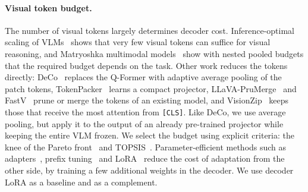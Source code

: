 \paragraph{Visual token budget.}
The number of visual tokens largely determines decoder cost. Inference-optimal scaling
of VLMs~\cite{li2024inferenceoptimal} shows that very few visual tokens can suffice for visual
reasoning, and
Matryoshka multimodal models~\cite{cai2024matryoshka} show with nested pooled budgets that the
required budget depends on the task. Other work reduces the tokens directly:
DeCo~\cite{yao2024deco} replaces the Q-Former with adaptive average pooling of the patch tokens,
TokenPacker~\cite{li2024tokenpacker} learns a compact projector,
LLaVA-PruMerge~\cite{shang2024prumerge} and FastV~\cite{chen2024fastv} prune or merge the tokens
of an existing model, and VisionZip~\cite{yang2025visionzip} keeps those that receive the most
attention from \texttt{[CLS]}. Like DeCo, we use average pooling, but apply it to the output of an
already pre-trained projector while keeping the entire VLM frozen. We select the budget using
explicit criteria:
the knee of the Pareto front~\cite{satopaa2011kneedle} and TOPSIS~\cite{hwang1981topsis}.
Parameter-efficient methods such as adapters~\cite{houlsby2019adapters}, prefix
tuning~\cite{li2021prefix} and LoRA~\cite{hu2022lora} reduce the cost of adaptation from the other
side, by training a few additional weights in the decoder. We use decoder LoRA as a baseline and as
a complement.
